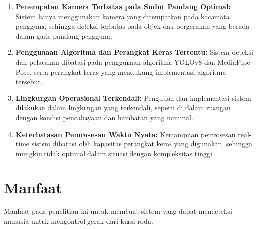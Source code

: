 \begin{enumerate}[nolistsep]
      \item \textbf{Penempatan Kamera Terbatas pada Sudut Pandang Optimal:} Sistem hanya menggunakan kamera yang ditempatkan pada kacamata pengguna, sehingga deteksi terbatas pada objek dan pergerakan yang berada dalam garis pandang pengguna.
      \item \textbf{Penggunaan Algoritma dan Perangkat Keras Tertentu:} Sistem deteksi dan pelacakan dibatasi pada penggunaan algoritma YOLOv8 dan MediaPipe Pose, serta perangkat keras yang mendukung implementasi algoritma tersebut.
      \item \textbf{Lingkungan Operasional Terkendali:} Pengujian dan implementasi sistem dilakukan dalam lingkungan yang terkendali, seperti di dalam ruangan dengan kondisi pencahayaan dan hambatan yang minimal.
      \item \textbf{Keterbatasan Pemrosesan Waktu Nyata:} Kemampuan pemrosesan real-time sistem dibatasi oleh kapasitas perangkat keras yang digunakan, sehingga mungkin tidak optimal dalam situasi dengan kompleksitas tinggi.
\end{enumerate}

\section{Manfaat}
\label{sec:manfaat}

Manfaat pada penelitian ini untuk membuat sistem yang dapat mendeteksi manusia untuk mengontrol gerak dari kursi roda.
